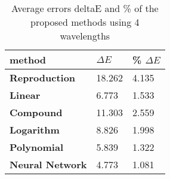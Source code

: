 \begin{table}[H]
  \caption{\label{tab:Average errors of the proposed methods}Average errors deltaE and \% of the proposed methods using 4 wavelengths}
      \begin{tabularx}{\textwidth}{C C C}
    \toprule
      \textbf{method} & \textbf{$\Delta E$} & \textbf{\% $\Delta E$} \\ \midrule
      \textbf{Reproduction} & 18.262 & 4.135\\ 
      \textbf{Linear} & 6.773 & 1.533\\ 
      \textbf{Compound} & 11.303 & 2.559\\ 
      \textbf{Logarithm} & 8.826 & 1.998\\ 
      \textbf{Polynomial} & 5.839 & 1.322\\ 
      \textbf{Neural Network} & 4.773 & 1.081\\ 
    \bottomrule
    \end{tabularx}
\end{table}
